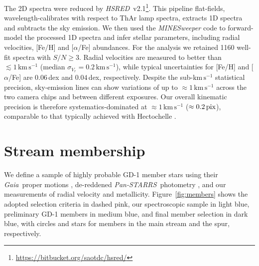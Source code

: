 \documentclass[twocolumn]{aastex63}
\newcommand{\package}[1]{\textsl{#1}}
\newcommand{\gaia}{\textsl{Gaia}}
\newcommand{\pans}{\textsl{Pan-STARRS}}
\newcommand{\kms}{\ensuremath{\textrm{km}\,\textrm{s}^{-1}}}
\begin{document}
The 2D spectra were reduced by \package{HSRED}~v2.1\footnote{\url{https://bitbucket.org/saotdc/hsred/}}.
This pipeline flat-fields, wavelength-calibrates with respect to ThAr lamp spectra, extracts 1D spectra and subtracts the sky emission.
We then used the \package{MINESweeper} code \citep{cargile2019} to forward-model the processed 1D spectra and infer stellar parameters, including radial velocities, [Fe/H] and [$\alpha$/Fe] abundances.
For the analysis we retained 1160 well-fit spectra with $S/N\geq3$.
Radial velocities are measured to better than $\lesssim1\,\kms$ (median $\sigma_{V_r}=0.2\,\kms$), while typical uncertainties for [Fe/H] and [$\alpha$/Fe] are $0.06$\,dex and $0.04$\,dex, respectively.
Despite the sub-$\kms$ statistical precision, sky-emission lines can show variations of up to $\approx1\,\kms$ across the two camera chips and between different exposures.
Our overall kinematic precision is therefore systematics-dominated at $\approx1\,\kms$ ($\approx0.2\,\rm pix$), comparable to that typically achieved with Hectochelle \citep[e.g.,][]{caldwell2017}.

\section{Stream membership}
\label{sec:membership}

We define a sample of highly probable GD-1 member stars using their \gaia\ proper motions \citep{gdr2}, de-reddened \pans\ photometry \citep{sfd, ps1}, and our measurements of radial velocity and metallicity.
Figure~\ref{fig:members} shows the adopted selection criteria in dashed pink, our spectroscopic sample in light blue, preliminary GD-1 members in medium blue, and final member selection in dark blue, with circles and stars for members in the main stream and the spur, respectively.
\end{document}
